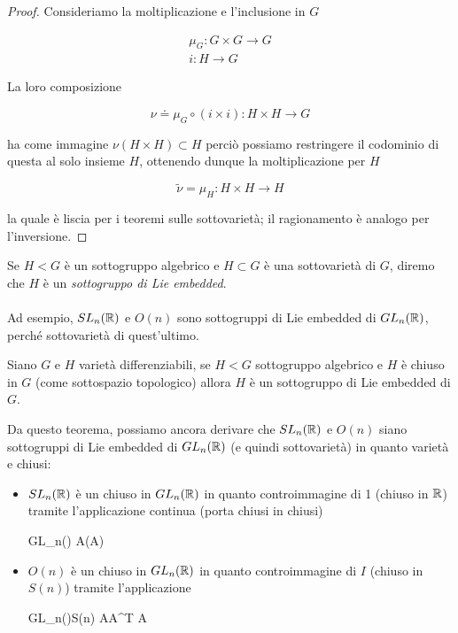 \begin{proof}
	Consideriamo la moltiplicazione e l'inclusione in $ G $
	
	\begin{gather}
		\mu_{G} : G \times G \to G \\
		i : H \to G
	\end{gather}

	La loro composizione
	
	\begin{equation}
		\nu \doteq \mu_{G} \circ (i \times i) : H \times H \to G
	\end{equation}

	ha come immagine $ \nu (H \times H) \subset H $ perciò possiamo restringere il codominio di questa al solo insieme $ H $, ottenendo dunque la moltiplicazione per $ H $
	
	\begin{equation}
		\tilde{\nu} = \mu_{H} : H \times H \to H
	\end{equation}

	la quale è liscia per i teoremi sulle sottovarietà; il ragionamento è analogo per l'inversione.
\end{proof}

Se $ H < G $ è un  sottogruppo algebrico e $ H \subset G $ è una sottovarietà di $ G $, diremo che $ H $ è un \textit{sottogruppo di Lie embedded}.\\\\
%
Ad esempio, $ SL_{n}(\mathbb{R}) $ e $ O(n) $ sono sottogruppi di Lie embedded di $ GL_{n}(\mathbb{R}) $, perché sottovarietà di quest'ultimo.

\begin{theorem}[Cartan]\label{thm:liesub-var}
	Siano $ G $ e $ H $ varietà differenziabili, se $ H < G $ sottogruppo algebrico e $ H $ è chiuso in $ G $ (come sottospazio topologico) allora $ H $ è un sottogruppo di Lie embedded di $ G $.
\end{theorem}

Da questo teorema, possiamo ancora derivare che $ SL_{n}(\mathbb{R}) $ e $ O(n) $ siano sottogruppi di Lie embedded di $ GL_{n}(\mathbb{R}) $ (e quindi sottovarietà) in quanto varietà e chiusi:

\begin{itemize}
	\item $ SL_{n}(\mathbb{R}) $ è un chiuso in $ GL_{n}(\mathbb{R}) $ in quanto controimmagine di 1 (chiuso in $ \mathbb{R} $) tramite l'applicazione continua (porta chiusi in chiusi)
	
		{GL_{n}(\R)}{\R}
		{A}{\det(A)}
	
	\item $ O(n) $ è un chiuso in $ GL_{n}(\mathbb{R}) $ in quanto controimmagine di $ I $ (chiuso in $ S(n) $) tramite l'applicazione
	
		{GL_{n}(\R)}{S(n)}
		{A}{A^{T} A}
\end{itemize}

